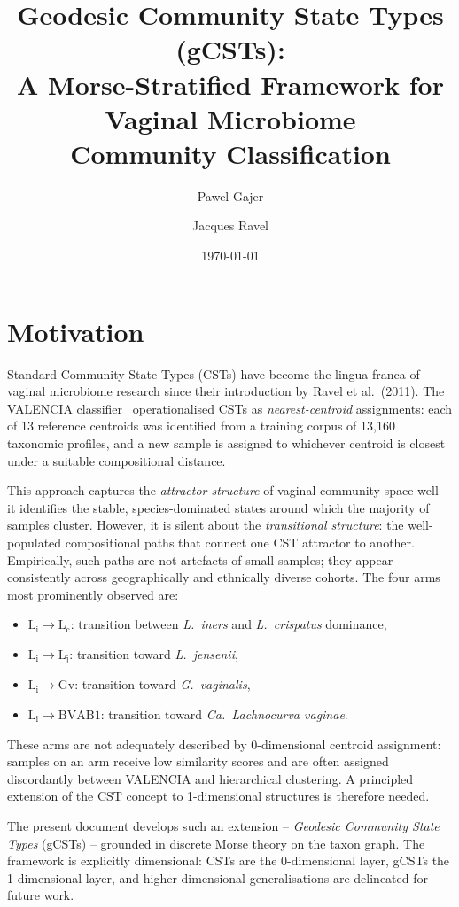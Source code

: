 \documentclass[11pt]{article}
\title{\textbf{Geodesic Community State Types (gCSTs):}\\
  A Morse-Stratified Framework for Vaginal Microbiome\\
  Community Classification}
\author{Pawel Gajer \and Jacques Ravel}
\date{\today}
\theoremstyle{plain}
\newcommand{\Li}{\mathrm{L}_\mathrm{i}}
\newcommand{\Lc}{\mathrm{L}_\mathrm{c}}
\newcommand{\Lj}{\mathrm{L}_\mathrm{j}}
\newcommand{\Gv}{\mathrm{Gv}}
\newcommand{\BVAB}{\mathrm{BVAB1}}
\begin{document}
\maketitle
\tableofcontents
\newpage

\section{Motivation}
\label{sec:motivation}

Standard Community State Types (CSTs) have become the lingua franca of vaginal
microbiome research since their introduction by Ravel et al.\ (2011).  The
VALENCIA classifier~\cite{france2020} operationalised CSTs as
\emph{nearest-centroid} assignments: each of 13 reference centroids was
identified from a training corpus of 13{,}160 taxonomic profiles, and a new
sample is assigned to whichever centroid is closest under a suitable
compositional distance.

This approach captures the \emph{attractor structure} of vaginal community
space well -- it identifies the stable, species-dominated states around which
the majority of samples cluster.  However, it is silent about the
\emph{transitional structure}: the well-populated compositional paths that
connect one CST attractor to another.  Empirically, such paths are not
artefacts of small samples; they appear consistently across geographically and
ethnically diverse cohorts.  The four arms most prominently observed are:
\begin{itemize}[noitemsep]
  \item $\Li \to \Lc$: transition between \textit{L.\ iners} and
        \textit{L.\ crispatus} dominance,
  \item $\Li \to \Lj$: transition toward \textit{L.\ jensenii},
  \item $\Li \to \Gv$: transition toward \textit{G.\ vaginalis},
  \item $\Li \to \BVAB$: transition toward \textit{Ca.\ Lachnocurva vaginae}.
\end{itemize}
These arms are not adequately described by 0-dimensional centroid assignment:
samples on an arm receive low similarity scores and are often assigned
discordantly between VALENCIA and hierarchical clustering.  A principled
extension of the CST concept to 1-dimensional structures is therefore needed.

The present document develops such an extension -- \emph{Geodesic Community
State Types} (gCSTs) -- grounded in discrete Morse theory on the taxon graph.
The framework is explicitly dimensional: CSTs are the 0-dimensional layer,
gCSTs the 1-dimensional layer, and higher-dimensional generalisations are
delineated for future work.
\end{document}
